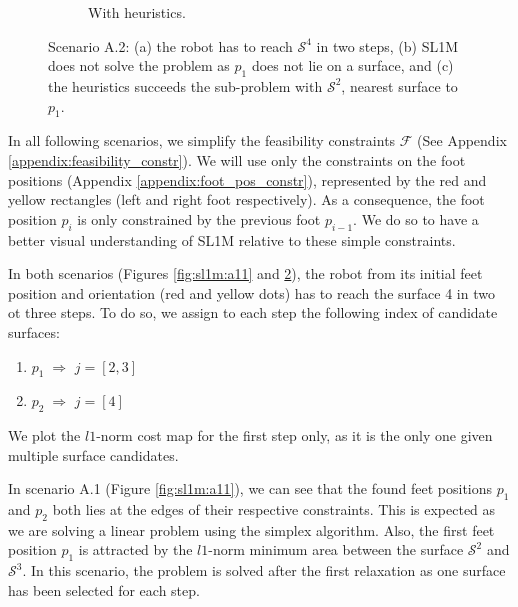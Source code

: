 \begin{figure}[ht]
\begin{subfigure}[t]{0.48\linewidth}
    \caption{With heuristics.}
    \label{fig:sl1m:a12:1}
    \end{subfigure}
    \caption{Scenario A.2: (a) the robot has to reach $\mathcal{S}^4$ in two steps, (b) SL1M does not solve the problem as $p_1$ does not lie on a surface, and (c) the heuristics succeeds the sub-problem with $\mathcal{S}^2$, nearest surface to $p_1$.}
    \label{fig:sl1m:a12}
\end{figure}
In all following scenarios, we simplify the feasibility constraints $\mathcal{F}$ (See Appendix \ref{appendix:feasibility_constr}).
We will use only the constraints on the foot positions (Appendix \ref{appendix:foot_pos_constr}), represented by the red and yellow rectangles (left and right foot respectively).
As a consequence, the foot position $p_i$ is only constrained by the previous foot $p_{i-1}$.
We do so to have a better visual understanding of SL1M relative to these simple constraints.

In both scenarios (Figures \ref{fig:sl1m:a11} and \ref{fig:sl1m:a12}), the robot from its initial feet position and orientation (red and yellow dots) has to reach the surface 4 in two ot three steps. To do so, we assign to each step the following index of candidate surfaces:
\begin{enumerate}
    \item $p_1 \; \Rightarrow$ \; $j = [2,3]$
    \item $p_2 \; \Rightarrow$ \; $j = [4]$
\end{enumerate}
We plot the $l1$-norm cost map for the first step only, as it is the only one given multiple surface candidates.

In scenario A.1 (Figure \ref{fig:sl1m:a11}), we can see that the found feet positions $p_1$ and $p_2$ both lies at the edges of their respective constraints. This is expected as we are solving a linear problem using the simplex algorithm.
Also, the first feet position $p_1$ is attracted by the $l1$-norm minimum area between the surface $\mathcal{S}^2$ and $\mathcal{S}^3$. 
In this scenario, the problem is solved after the first relaxation as one surface has been selected for each step.

